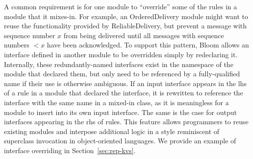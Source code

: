 A common requirement is for one module to ``override'' some of the rules in a
module that it mixes-in. For example, an OrderedDelivery module might want to
reuse the functionality provided by ReliableDelivery, but prevent a message with
sequence number $x$ from being delivered until all messages with sequence
numbers $<x$ have been acknowledged. To support this pattern, Bloom allows an
interface defined in another module to be overridden simply by redeclaring
it. Internally, these redundantly-named interfaces exist in the namespace of the
module that declared them, but only need to be referenced by a fully-qualified
name if their use is otherwise ambiguous.  If an input interface appears in the
lhs of a rule in a module that declared the interface, it is rewritten to
reference the interface with the same name in a mixed-in class, as it is
meaningless for a module to insert into its own input interface.  The same is
the case for output interfaces appearing in the rhs of rules.  This feature
allows programmers to reuse existing modules and interpose additional logic in a
style reminiscent of superclass invocation in object-oriented languages.  We
provide an example of interface overriding in Section~\ref{sec:rep-kvs}.


